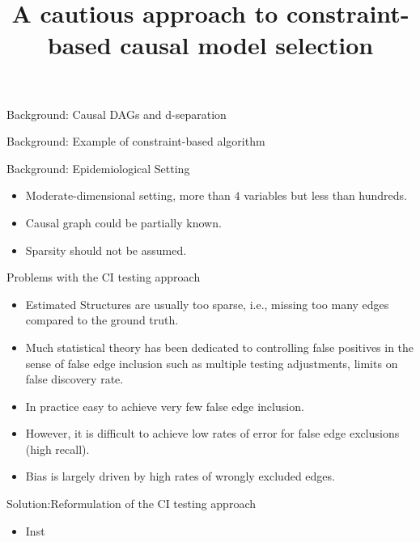 \documentclass{beamer}
\begin{document}
\title[]{A cautious approach to constraint-based causal model selection}
\date{}

\maketitle

\begin{frame}{Background: Causal DAGs and d-separation}
\end{frame}

\begin{frame}{Background: Example of constraint-based algorithm}
\end{frame}

\begin{frame}{Background: Epidemiological Setting}
	\begin{itemize}
		\item Moderate-dimensional setting, more than $ 4 $ variables but less than hundreds.
		\item Causal graph could be partially known.
		\item Sparsity should not be assumed.
	\end{itemize}
\end{frame}

\begin{frame}{Problems with the CI testing approach}
	\begin{itemize}
		\item Estimated Structures are usually too sparse, i.e., missing too many edges compared to the ground truth.
		\item Much statistical theory has been dedicated to controlling false positives in the sense of false edge inclusion such as multiple testing adjustments, limits on false discovery rate.
		\item In practice easy to achieve very few false edge inclusion.
		\item However, it is difficult to achieve low rates of error for false edge exclusions (high recall).
		\item Bias is largely driven by high rates of wrongly excluded edges.
	\end{itemize}
\end{frame}

\begin{frame}{Solution:Reformulation of the CI testing approach}
	\begin{itemize}
		\item Inst
	\end{itemize}
\end{frame}
\end{document}

